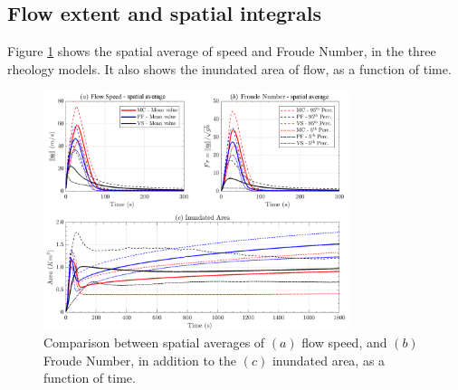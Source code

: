 \documentclass{article}
\begin{document}
\subsection{Flow extent and spatial integrals}
Figure \ref{fig:Colima-spatial} shows the spatial average of speed and Froude Number, in the three rheology models. It also shows the inundated area of flow, as a function of time. 
\begin{figure}[H]
        \centering
        \includegraphics[width=0.8\textwidth]{BAF_VolcanDeColima/AveragedMeasurments/Averaged_MeasuresColima.png}
        \caption{Comparison between spatial averages of $(a)$ flow speed, and $(b)$ Froude Number, in addition to the $(c)$ inundated area, as a function of time.}
        \label{fig:Colima-spatial}
\end{figure}
\end{document}
